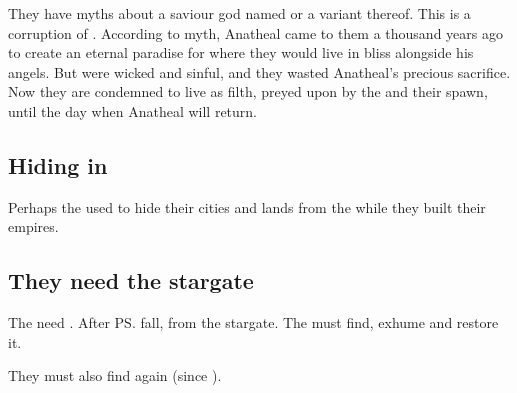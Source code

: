 They have myths about a saviour god named  or a variant thereof. 
This is a corruption of . 
According to myth, Anatheal came to them a thousand years ago to create an eternal paradise for \humans{} where they would live in bliss alongside his angels. 
But \humans{} were wicked and sinful, and they wasted Anatheal's precious sacrifice. 
Now they are condemned to live as filth, preyed upon by the \dragons{} and their spawn, until the day when Anatheal will return. 









\subsection{Hiding in \Nyx}
Perhaps the \resphain{} used \Nyx{} to hide their cities and lands from the \dragons{} while they built their empires. 









\subsection{They need the stargate}
The \resphain{} need . 
After \ps{\Thanatzil}{} fall,  from the stargate. 
The \resphain{} must find, exhume and restore it. 

They must also find \Semiza{} again (since ). 






